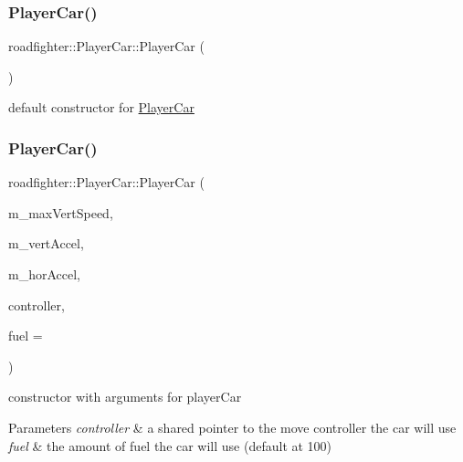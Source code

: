 \subsubsection{\texorpdfstring{Player\+Car()}{PlayerCar()}\hspace{0.1cm}{\footnotesize\ttfamily [1/4]}}
{\footnotesize\ttfamily roadfighter\+::\+Player\+Car\+::\+Player\+Car (\begin{DoxyParamCaption}{ }\end{DoxyParamCaption})\hspace{0.3cm}{\ttfamily [default]}}

default constructor for \hyperlink{classroadfighter_1_1PlayerCar}{Player\+Car} \mbox{\label{classroadfighter_1_1PlayerCar_a0e4db8cf7fc38214fa0383e1518ab2a2}} 
\subsubsection{\texorpdfstring{Player\+Car()}{PlayerCar()}\hspace{0.1cm}{\footnotesize\ttfamily [2/4]}}
{\footnotesize\ttfamily roadfighter\+::\+Player\+Car\+::\+Player\+Car (\begin{DoxyParamCaption}\item[{double}]{m\+\_\+max\+Vert\+Speed,  }\item[{double}]{m\+\_\+vert\+Accel,  }\item[{double}]{m\+\_\+hor\+Accel,  }\item[{std\+::shared\+\_\+ptr$<$ \hyperlink{classroadfighter_1_1InputController}{Input\+Controller} $>$}]{controller,  }\item[{int}]{fuel = {} }\end{DoxyParamCaption})}

constructor with arguments for player\+Car 
\begin{DoxyParams}{Parameters}
{\em controller} & a shared pointer to the move controller the car will use \\
\hline
{\em fuel} & the amount of fuel the car will use (default at 100) \\
\hline
\end{DoxyParams}
\mbox{\label{classroadfighter_1_1PlayerCar_a89f593714201e6d8252abd19125c7c88}} 
